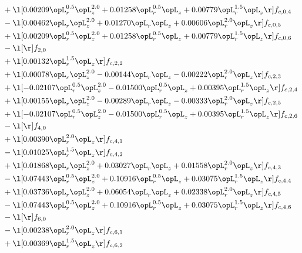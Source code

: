 \begin{alignat}{2}
& + \l[  0.00209 \opL_r^{0.5} \opL_z^{2.0} +  0.01258 \opL_r^{0.5} \opL_z +  0.00779 \opL_r^{1.5} \opL_z  \r] f_{c,0,4} \nonumber \\ 
& - \l[  0.00462 \opL_r \opL_z^{2.0} +  0.01270 \opL_r \opL_z +  0.00606 \opL_r^{2.0} \opL_z  \r] f_{c,0,5} \nonumber \\ 
& + \l[  0.00209 \opL_r^{0.5} \opL_z^{2.0} +  0.01258 \opL_r^{0.5} \opL_z +  0.00779 \opL_r^{1.5} \opL_z  \r] f_{c,0,6} \nonumber \\ 
& - \l[  \r] f_{2,0} \nonumber \\ 
& + \l[  0.00132 \opL_r^{1.5} \opL_z  \r] f_{c,2,2} \nonumber \\ 
& + \l[  0.00078 \opL_r \opL_z^{2.0}   -0.00144 \opL_r \opL_z   -0.00222 \opL_r^{2.0} \opL_z  \r] f_{c,2,3} \nonumber \\ 
& + \l[  -0.02107 \opL_r^{0.5} \opL_z^{2.0}   -0.01500 \opL_r^{0.5} \opL_z +  0.00395 \opL_r^{1.5} \opL_z  \r] f_{c,2,4} \nonumber \\ 
& + \l[  0.00155 \opL_r \opL_z^{2.0}   -0.00289 \opL_r \opL_z   -0.00333 \opL_r^{2.0} \opL_z  \r] f_{c,2,5} \nonumber \\ 
& + \l[  -0.02107 \opL_r^{0.5} \opL_z^{2.0}   -0.01500 \opL_r^{0.5} \opL_z +  0.00395 \opL_r^{1.5} \opL_z  \r] f_{c,2,6} \nonumber \\ 
& - \l[  \r] f_{4,0} \nonumber \\ 
& + \l[  0.00390 \opL_r^{2.0} \opL_z  \r] f_{c,4,1} \nonumber \\ 
& - \l[  0.01025 \opL_r^{1.5} \opL_z  \r] f_{c,4,2} \nonumber \\ 
& + \l[  0.01868 \opL_r \opL_z^{2.0} +  0.03027 \opL_r \opL_z +  0.01558 \opL_r^{2.0} \opL_z  \r] f_{c,4,3} \nonumber \\ 
& - \l[  0.07443 \opL_r^{0.5} \opL_z^{2.0} +  0.10916 \opL_r^{0.5} \opL_z +  0.03075 \opL_r^{1.5} \opL_z  \r] f_{c,4,4} \nonumber \\ 
& + \l[  0.03736 \opL_r \opL_z^{2.0} +  0.06054 \opL_r \opL_z +  0.02338 \opL_r^{2.0} \opL_z  \r] f_{c,4,5} \nonumber \\ 
& - \l[  0.07443 \opL_r^{0.5} \opL_z^{2.0} +  0.10916 \opL_r^{0.5} \opL_z +  0.03075 \opL_r^{1.5} \opL_z  \r] f_{c,4,6} \nonumber \\ 
& - \l[  \r] f_{6,0} \nonumber \\ 
& - \l[  0.00238 \opL_r^{2.0} \opL_z  \r] f_{c,6,1} \nonumber \\ 
& + \l[  0.00369 \opL_r^{1.5} \opL_z  \r] f_{c,6,2} \nonumber \\ 

\end{alignat}
